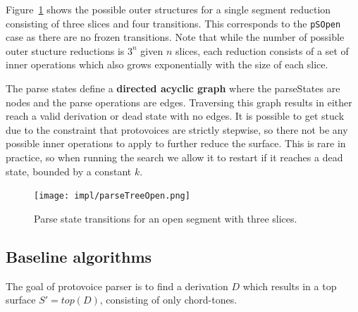 \documentclass[12pt,a4paper,twoside,openright]{report}
\theoremstyle{definition}
\begin{document}
Figure~\ref{fig:statetrans} shows the possible outer structures for a single segment reduction consisting of three slices and four transitions. 
This corresponds to the \texttt{pSOpen} case as there are no frozen transitions. 
Note that while the number of possible outer stucture reductions is $3^n$ given $n$ slices, each reduction consists of a set of inner operations which also grows exponentially with the size of each slice.  

The parse states define a \textbf{directed acyclic graph} where the parseStates are nodes and the parse operations are edges. 
Traversing this graph results in either reach a valid derivation or dead state with no edges. It is possible to get stuck due to the constraint that protovoices are strictly stepwise, so there not be any possible inner operations to apply to further reduce the surface. 
This is rare in practice, so when running the search we allow it to restart if it reaches a dead state, bounded by a constant $k$.

\begin{figure}[h]
  \centering
  \texttt{[image: impl/parseTreeOpen.png]}
  \caption{Parse state transitions for an open segment with three slices.}
  \label{fig:statetrans}
\end{figure}



\subsection{Baseline algorithms}
The goal of protovoice parser is to find a derivation $D$ which results in a top surface $S' = top(D)$, consisting of only chord-tones. 
\end{document}
